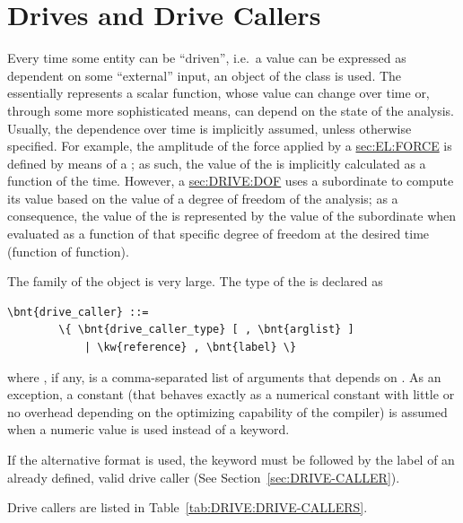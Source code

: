 \section{Drives and Drive Callers}\label{sec:DRIVE}
Every time some entity can be ``driven'', i.e.\ a value can be
expressed as dependent on some ``external'' input, an object of the class 
 is used. 
The  essentially represents a scalar function, whose
value can change over time or, through some more sophisticated
means, can depend on the state of the analysis.
Usually, the dependence over time is implicitly assumed, unless
otherwise specified.
For example, the amplitude of the force applied by a 
\hyperref{\kw{force} element}{\kw{force} element (see Section~}{)}{sec:EL:FORCE}
is defined by means of a ; as such, the value of the  
is implicitly calculated as a function of the time.
However, a 
\hyperref{\kw{dof drive}}{\kw{dof drive} (see Section~}{)}{sec:DRIVE:DOF}
uses a subordinate  to compute its value based on the value
of a degree of freedom of the analysis; as a consequence,
the value of the  is represented by the
value of the subordinate  when evaluated as a function
of that specific degree of freedom at the desired time (function of function).

The family of the  object is very large.
The type of the  is declared as
\begin{Verbatim}[commandchars=\\\{\}]
    \bnt{drive_caller} ::=
        \{ \bnt{drive_caller_type} [ , \bnt{arglist} ]
            | \kw{reference} , \bnt{label} \}
\end{Verbatim}    
where , if any, is a comma-separated list of arguments
that depends on .
As an exception, a constant  (that behaves exactly as a
numerical constant with little or no overhead depending on the optimizing
capability of the compiler) is assumed when a numeric value is used instead
of a keyword.

If the alternative format is used, the keyword  
must be followed by the label of an already defined, valid drive caller
(See Section~\ref{sec:DRIVE-CALLER}).

Drive callers are listed in Table~\ref{tab:DRIVE:DRIVE-CALLERS}.

